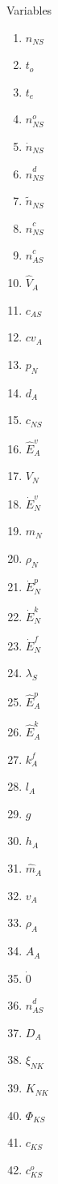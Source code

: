 \documentclass[10pt,a4paper]{report}
\begin{document}
	\Large{Variables}
	
	\begin{multicols}{2}
		\begin{enumerate}
			\item $n_{NS}$
			\item $t_o$
			\item $t_e$
			\item $n^{o}_{NS}$
			\item $\dot{n}_{NS}$
			\item $\hat{n}^{d}_{NS}$
			\item $\tilde{n}_{NS}$
			\item $\hat{n}^{c}_{NS}$
			\item $\hat{n}^{c}_{AS}$
			\item $\hat{V}_{A}$
			\item $c_{AS}$
			\item $cv_A$
			\item $p_N$
			\item $d_A$
			\item $c_{NS}$
			\item $\hat{E}^{v}_{A}$
			\item $V_N$
			\item $\dot{E}^{v}_N$
			\item $m_N$
			\item $\rho_N$
			\item $\dot{E}^{p}_N$
			\item $\dot{E}^{k}_N$
			\item $\dot{E}^{f}_N$
			\item $\lambda_S$
			\item $\hat{E}^{p}_{A}$
			\item $\hat{E}^{k}_{A}$
			\item $k^{f}_A$
			\item $l_A$
			\item $g$
			\item $h_A$
			\item $\hat{m}_A$
			\item $v_A$
			\item $\rho_A$
			\item $A_A$
			\item $\dot{0}$
			\item $\hat{n}^{d}_{AS}$
			\item $D_A$
			\item $\xi_{NK}$
			\item $K_{NK}$
			\item $\Phi_{KS}$
			\item $c_{KS}$
			\item $c^{o}_{KS}$			 
		\end{enumerate}
	\end{multicols}	
\end{document}
